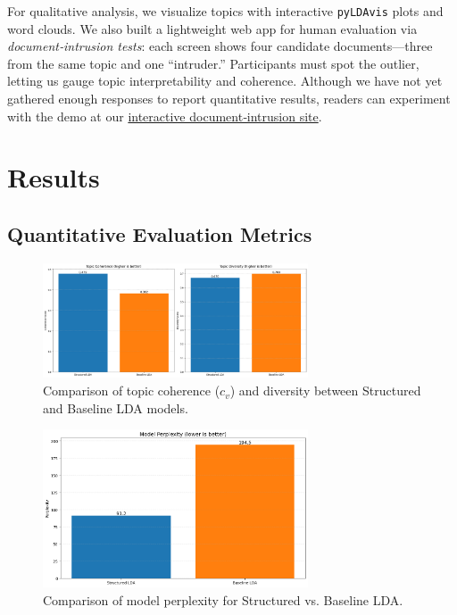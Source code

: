 \documentclass{article}
\begin{document}
For qualitative analysis, we visualize topics with interactive \texttt{pyLDAvis} plots and word clouds.
We also built a lightweight web app for human evaluation via \emph{document‑intrusion tests}: each screen shows four candidate documents—three from the same topic and one “intruder.” Participants must spot the outlier, letting us gauge topic interpretability and coherence.
Although we have not yet gathered enough responses to report quantitative results, readers can experiment with the demo at our \href{https://sammucyo.com/doc-intrusion-test/}{interactive document‑intrusion site}.




\section{Results}
\subsection{Quantitative Evaluation Metrics}

\begin{figure}[ht]
    \centering
    \includegraphics[width=0.7\textwidth]{plots/coherence_and_diversity_plots.png}
    \caption{Comparison of topic coherence ($c_v$) and diversity between Structured and Baseline LDA models.}
    \label{fig:coherence-diversity}
\end{figure}

\begin{figure}[ht]
    \centering
    \includegraphics[width=0.7\textwidth]{plots/perplexity_plot.png}
    \caption{Comparison of model perplexity for Structured vs. Baseline LDA.}
    \label{fig:perplexity}
\end{figure}
\end{document}
